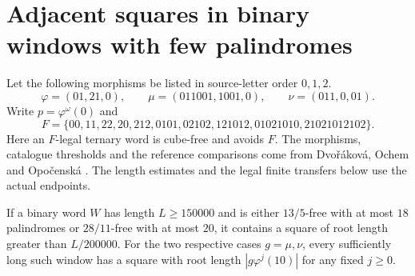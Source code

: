 \section{Adjacent squares in binary windows with few palindromes}
\label{sec:binary-finite}

Let the following morphisms be listed in source-letter order \(0,1,2\).
\[
  \varphi=(01,21,0),\qquad \mu=(011001,1001,0),\qquad \nu=(011,0,01).
\]
Write \(p=\varphi^\omega(0)\) and
\[
 F=\{00,11,22,20,212,0101,02102,121012,01021010,21021012102\}.
\]
Here an \(F\)-legal ternary word is cube-free and avoids \(F\). The morphisms, catalogue thresholds and the reference comparisons come from Dvo\v r\'akov\'a, Ochem and Opo\v censk\'a \cite{DOO}. The length estimates and the legal finite transfers below use the actual endpoints.

\begin{theorem}\label{thm:binary-linear-square}
If a binary word \(W\) has length \(L\ge150000\) and is either \(13/5\)-free with at most \(18\) palindromes or \(28/11\)-free with at most \(20\), it contains a square of root length greater than \(L/200000\). For the two respective cases \(g=\mu,\nu\), every sufficiently long such window has a square with root length \(|g\varphi^j(10)|\) for any fixed \(j\ge0\).
\end{theorem}

